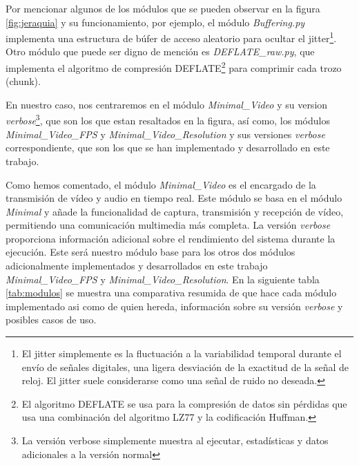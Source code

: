 Por mencionar algunos de los módulos que se pueden observar en la figura \ref{fig:jeraquia} y su funcionamiento, por ejemplo, el módulo \textit{Buffering.py} implementa una estructura de búfer de acceso aleatorio para ocultar el jitter\footnote{El jitter simplemente es la fluctuación a la variabilidad temporal durante el envío de señales digitales, una ligera desviación de la exactitud de la señal de reloj. El jitter suele considerarse como una señal de ruido no deseada.}. Otro módulo que puede ser digno de mención es \textit{DEFLATE\_raw.py}, que implementa el algoritmo de compresión DEFLATE\footnote{El algoritmo DEFLATE se usa para la compresión de datos sin pérdidas que usa una combinación del algoritmo LZ77 y la codificación Huffman.} para comprimir cada trozo (chunk).

\vspace{\baselineskip}
En nuestro caso, nos centraremos en el módulo \textit{Minimal\_Video} y su version \textit{verbose}\footnote{La versión verbose simplemente muestra al ejecutar, estadísticas y datos adicionales a la versión normal}, que son los que estan resaltados en la figura, así como, los módulos \textit{Minimal\_Video\_FPS} y \textit{Minimal\_Video\_Resolution} y sus versiones \textit{verbose} correspondiente, que son los que se han implementado y desarrollado en este trabajo.

\vspace{\baselineskip}
Como hemos comentado, el módulo \textit{Minimal\_Video} es el encargado de la transmisión de vídeo y audio en tiempo real. Este módulo se basa en el módulo \textit{Minimal} y añade la funcionalidad de captura, transmisión y recepción de vídeo, permitiendo una comunicación multimedia más completa. La versión \textit{verbose} proporciona información adicional sobre el rendimiento del sistema durante la ejecución. Este será nuestro módulo base para los otros dos módulos adicionalmente implementados y desarrollados en este trabajo \textit{Minimal\_Video\_FPS} y \textit{Minimal\_Video\_Resolution}. En la siguiente tabla \ref{tab:modulos} se muestra una comparativa resumida de que hace cada módulo implementado asi como de quien hereda, información sobre su versión \textit{verbose} y posibles casos de uso.

